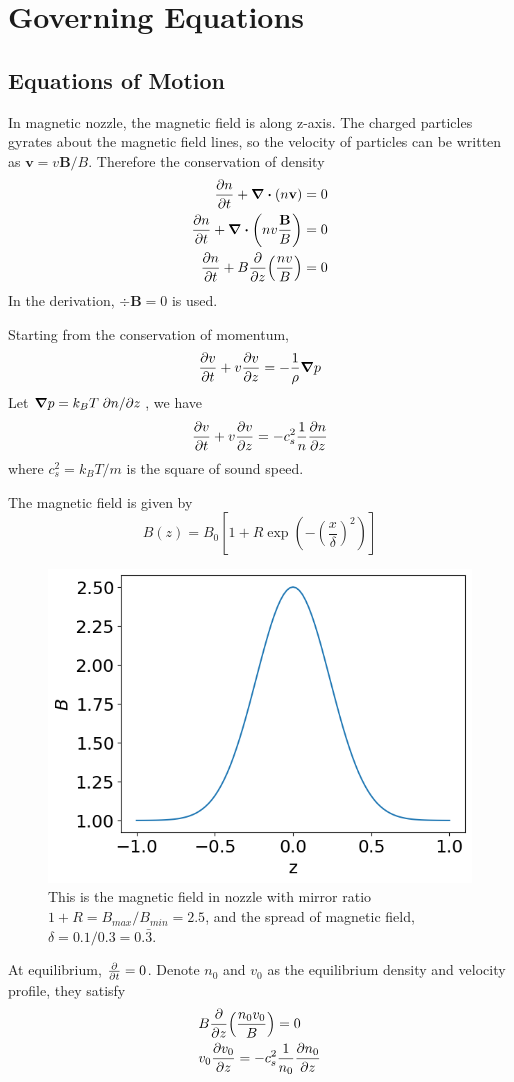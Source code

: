 \chapter{Governing Equations}

\section{Equations of Motion}
In magnetic nozzle, the magnetic field is along z-axis. The charged particles gyrates about the magnetic field lines, so the velocity of particles can be written as $\mathbf{v} = v\mathbf{B}/B$. Therefore the conservation of density 
\begin{align*}
	\pdv{n}{t} + \div(n\mathbf{v}) &= 0 \\
	\pdv{n}{t} + \div(nv\frac{\mathbf{B}}{B}) &= 0 \\
 	\pdv{n}{t} + B\pdv{z}(\frac{nv}{B}) &= 0
\end{align*}
In the derivation, $\div{\mathbf{B}} = 0$ is used.


Starting from the conservation of momentum, 
\[ \pdv{v}{t} + v\pdv{v}{z} = -\frac{1}{\rho}\grad{p} \]
Let $\grad{p} = k_BT\pdv*{n}{z}$, we have
\[ \pdv{v}{t} + v\pdv{v}{z} = -c_s^2\frac{1}{n}\pdv{n}{z} \]
where $c_s^2 = k_BT/m$ is the square of sound speed.

The magnetic field is given by
\[ B(z) = B_0 \left[1 + R\exp(-\left(\frac{x}{\delta}\right)^2)\right] \]
\begin{figure}[H]
	\centering
	\includegraphics[width=0.7\linewidth]{img/magnetic-field}
	\caption{This is the magnetic field in nozzle with mirror ratio $1+R=B_{max}/B_{min}=2.5$, and the spread of magnetic field, $\delta=0.1/0.3=0.\bar{3}$. }
	\label{fig:magnetic-field}
\end{figure}


At equilibrium, $\pdv{t}=0$. Denote $n_0$ and $v_0$ as the equilibrium density and velocity profile, they satisfy
\begin{align*}
	&B\pdv{z}(\frac{n_0v_0}{B}) = 0\\
	&v_0\pdv{v_0}{z} = -c_s^2\frac{1}{n_0}\pdv{n_0}{z}
\end{align*}

